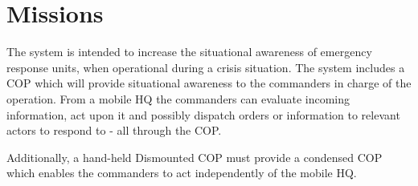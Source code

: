 \section{Missions}
The system is intended to increase the situational awareness of emergency response units, when operational during a crisis situation. The system includes a COP which will provide situational awareness to the commanders in charge of the operation. From a mobile HQ the commanders can evaluate incoming information, act upon it and possibly dispatch orders or information to relevant actors to respond to - all through the COP.

Additionally, a hand-held Dismounted COP must provide a condensed COP which enables the commanders to act independently of the mobile HQ. 